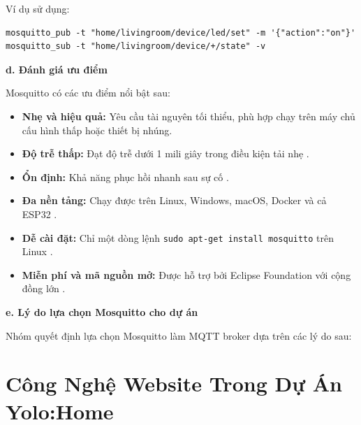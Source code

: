 Ví dụ sử dụng:
\begin{verbatim}
mosquitto_pub -t "home/livingroom/device/led/set" -m '{"action":"on"}'
mosquitto_sub -t "home/livingroom/device/+/state" -v
\end{verbatim}

\textbf{d. Đánh giá ưu điểm}

Mosquitto có các ưu điểm nổi bật sau:

\begin{itemize}
    \item \textbf{Nhẹ và hiệu quả:} Yêu cầu tài nguyên tối thiểu, phù hợp chạy trên máy chủ cấu hình thấp hoặc thiết bị nhúng.
    \item \textbf{Độ trễ thấp:} Đạt độ trễ dưới 1 mili giây trong điều kiện tải nhẹ .
    \item \textbf{Ổn định:} Khả năng phục hồi nhanh sau sự cố .
    \item \textbf{Đa nền tảng:} Chạy được trên Linux, Windows, macOS, Docker và cả ESP32 .
    \item \textbf{Dễ cài đặt:} Chỉ một dòng lệnh \texttt{sudo apt-get install mosquitto} trên Linux .
    \item \textbf{Miễn phí và mã nguồn mở:} Được hỗ trợ bởi Eclipse Foundation với cộng đồng lớn .
\end{itemize}

\textbf{e. Lý do lựa chọn Mosquitto cho dự án}

Nhóm quyết định lựa chọn Mosquitto làm MQTT broker dựa trên các lý do sau:

\begin{center}
\end{center}

\section{Công Nghệ Website Trong Dự Án Yolo:Home}
